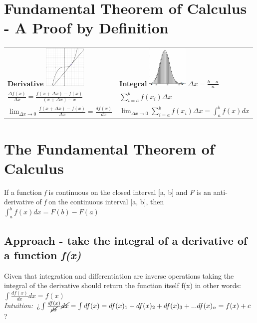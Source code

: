 \documentclass{article}
\author{Uzair Akram}
\begin{document}
\section*{Fundamental Theorem of Calculus - A Proof by Definition}

\begin{tabular}{l l}
\textbf{Derivative}  \hspace{2cm} \includegraphics[height=2cm]{derivative.png} \hspace{2cm}  &  \textbf{Integral}   \hspace{2cm}  \includegraphics[height=2cm]{integral.png}  $\Delta x = \frac{b - a}{n}$ \\
$\frac{\Delta f(x)}{\Delta x} = \frac{f(x + \Delta x) - f(x)}{(x + \Delta x) - x}$  &  $\sum\limits_{i=a}^b f(x_i)\Delta x$ \\
$\lim_{\Delta x\to 0} \frac{f(x + \Delta x) - f(x)}{\Delta x} = \frac{df(x)}{dx}$  &  $\lim_{\Delta x\to 0}\sum\limits_{i=a}^b f(x_i)\Delta x = \int_{a}^b f(x)dx$ \\
\end{tabular}

\section*{The Fundamental Theorem of Calculus}
If a function \emph{f} is continuous on the closed interval [a, b] and \emph{F} is an anti-derivative of \emph{f} on the continuous interval [a, b], then $\int_{a}^b f(x)dx = F(b) - F(a)$

\subsection*{Approach - take the integral of a derivative of a function \emph{f(x)}}
Given that integration and differentiation are inverse operations taking the integral of the derivative should return the function itself f(x) in other words:  $\int \frac{df(x)}{dx}dx = f(x)$ \\
\emph{Intuition: } %
$\text{?`}\int \frac{df(x)}{\cancel{dx}}\cancel{dx} = \int df(x) = df(x)_1 + df(x)_2 + df(x)_3 + ... df(x)_n = f(x) + c$ ? \\
\end{document}

